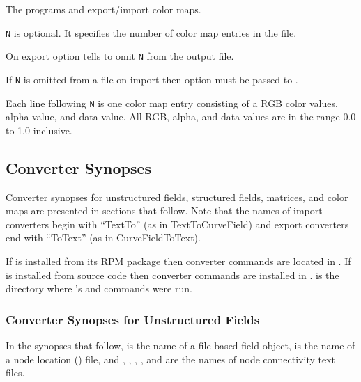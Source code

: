 The programs  and 
export/import color maps.

\verb|N| is optional.  It specifies the number of color map entries in
the file.  

On export option  tells  to
omit \verb|N| from the output file.

If \verb|N| is omitted from a file on import then option
 must be passed to .

Each line following \verb|N| is one color map entry consisting of a
RGB color values, alpha value, and data value.  All RGB, alpha, and
data values are in the range 0.0 to 1.0 inclusive.

\subsection{Converter Synopses}
\label{sec:converter_synopses}

Converter synopses for unstructured fields, structured fields, matrices,
and color maps are presented in sections that follow.   Note that
the names of import converters begin with ``TextTo'' (as in
TextToCurveField) and export converters end with ``ToText'' (as in
CurveFieldToText).

If \sr{} is installed from its RPM package then converter commands are
located in .  If \sr{} is installed
from source code then converter commands are installed in
.   is
the directory where \sr{}'s  and 
commands were run.

\subsubsection{Converter Synopses for Unstructured Fields}
\label{sec:unstruct_field_synopses}

In the synopses that follow,  is the name of a \sr{}
file-based field object,  is the name of a node location
() file, and , , ,
, and  are the names of node connectivity
text files.

